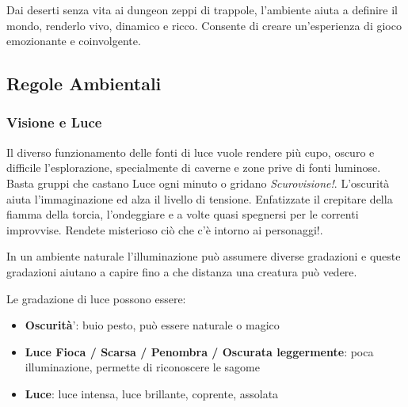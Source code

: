 \begin{multicols}{2}

Dai deserti senza vita ai dungeon zeppi di trappole, l'ambiente aiuta a definire il mondo, renderlo vivo, dinamico e ricco. Consente di creare un'esperienza di gioco emozionante e coinvolgente.

\subsection{Regole Ambientali}

\label{regole-ambientali}

\subsubsection{Visione e Luce}\hypertarget{visioneeluce}{}\label{visioneeluce}

\begin{changemargin}{0.3cm}{0.3cm}\begin{narratore}
Il diverso funzionamento delle fonti di luce vuole rendere più cupo, oscuro e difficile l'esplorazione, specialmente di caverne e zone prive di fonti luminose. Basta gruppi che castano Luce ogni minuto o gridano \emph{Scurovisione!}. L'oscurità aiuta l'immaginazione ed alza il livello di tensione. Enfatizzate il crepitare della fiamma della torcia, l'ondeggiare e a volte quasi spegnersi per le correnti improvvise. Rendete misterioso ciò che c'è intorno ai personaggi!.
\end{narratore}\end{changemargin}

\label{sec:visione-e-luce}

In un ambiente naturale l'illuminazione può assumere diverse gradazioni e queste gradazioni aiutano a capire fino a che distanza una creatura può vedere.

Le gradazione di luce possono essere:
\begin{itemize}[leftmargin=*] \setlength{\itemsep}{0pt}
\item
\textbf{Oscurità}': buio pesto, può essere naturale o magico
\item
\textbf{Luce Fioca / Scarsa / Penombra / Oscurata leggermente}: poca illuminazione, permette di riconoscere le sagome
\item
\textbf{Luce}: luce intensa, luce brillante, coprente, assolata
\end{itemize}


\end{multicols}
